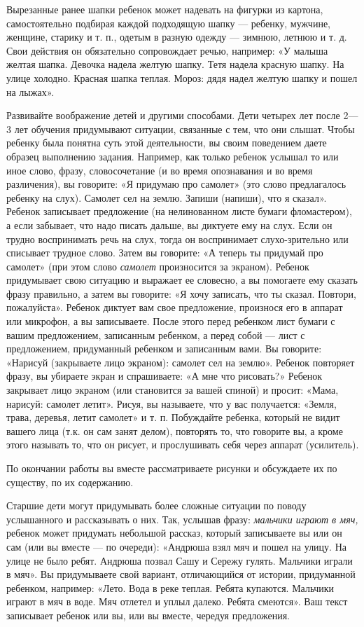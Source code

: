 \documentclass[a5paper]{book}
\renewcommand{\emph}[1]{\textit{#1}}
\begin{document}
Вырезанные ранее шапки ребенок может надевать на фигурки из картона,
самостоятельно подбирая каждой подходящую шапку --- ребенку, мужчине,
женщине, старику и т. п., одетым в разную одежду --- зимнюю, летнюю и т.
д. Свои действия он обязательно сопровождает речью, например: «У малыша
желтая шапка. Девочка надела желтую шапку. Тетя надела красную шапку. На
улице холодно. Красная шапка теплая. Мороз: дядя надел желтую шапку и
пошел на лыжах».

Развивайте воображение детей и другими способами. Дети четырех лет после
2---3 лет обучения придумывают ситуации, связанные с тем, что они
слышат. Чтобы ребенку была понятна суть этой деятельности, вы своим
поведением даете образец выполнению задания. Например, как только
ребенок услышал то или иное слово, фразу, словосочетание (и во время
опознавания и во время различения), вы говорите: «Я придумаю про
самолет» (это слово предлагалось ребенку на слух). Самолет сел на землю.
Запиши (напиши), что я сказал». Ребенок записывает предложение (на
нелинованном листе бумаги фломастером), а если забывает, что надо писать
дальше, вы диктуете ему на слух. Если он трудно воспринимать речь на
слух, тогда он воспринимает слухо-зрительно или списывает трудное слово.
Затем вы говорите: «А теперь ты придумай про самолет» (при этом слово
\emph{самолет} произносится за экраном). Ребенок придумывает свою
ситуацию и выражает ее словесно, а вы помогаете ему сказать фразу
правильно, а затем вы говорите: «Я хочу записать, что ты сказал.
Повтори, пожалуйста». Ребенок диктует вам свое предложение, произнося
его в аппарат или микрофон, а вы записываете. После этого перед ребенком
лист бумаги с вашим предложением, записанным ребенком, а перед собой ---
лист с предложением, придуманный ребенком и записанным вами. Вы
говорите: «Нарисуй (закрываете лицо экраном): самолет сел на землю».
Ребенок повторяет фразу, вы убираете экран и спрашиваете: «А мне что
рисовать?» Ребенок закрывает лицо экраном (или становится за вашей
спиной) и просит: «Мама, нарисуй: самолет летит». Рисуя, вы называете,
что у вас получается: «Земля, трава, деревья, летит самолет» и т. п.
Побуждайте ребенка, который не видит вашего лица (т.к. он сам занят
делом), повторять то, что говорите вы, а кроме этого называть то, что он
рисует, и прослушивать себя через аппарат (усилитель).

По окончании работы вы вместе рассматриваете рисунки и обсуждаете их по
существу, по их содержанию.

Старшие дети могут придумывать более сложные ситуации по поводу
услышанного и рассказывать о них. Так, услышав фразу: \emph{мальчики
играют в мяч,} ребенок может придумать небольшой рассказ, который
записываете вы или он сам (или вы вместе --- по очереди): «Андрюша взял
мяч и пошел на улицу. На улице не было ребят. Андрюша позвал Сашу и
Сережу гулять. Мальчики играли в мяч». Вы придумываете свой вариант,
отличающийся от истории, придуманной ребенком, например: «Лето. Вода в
реке теплая. Ребята купаются. Мальчики играют в мяч в воде. Мяч отлетел
и уплыл далеко. Ребята смеются». Ваш текст записывает ребенок или вы,
или вы вместе, чередуя предложения.
\end{document}
